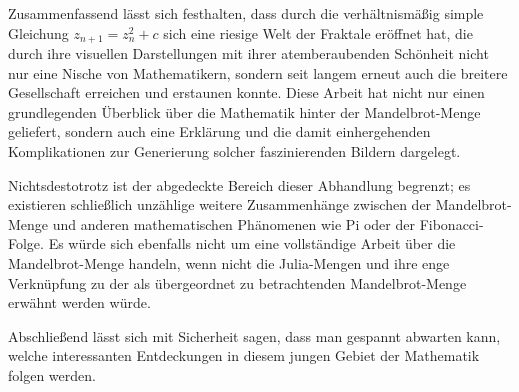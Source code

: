 
Zusammenfassend lässt sich festhalten, dass durch die verhältnismäßig simple
Gleichung $z_{n+1} = z_n^2 + c$ sich eine riesige Welt der Fraktale eröffnet
hat, die durch ihre visuellen Darstellungen mit ihrer atemberaubenden Schönheit
nicht nur eine Nische von Mathematikern, sondern seit langem erneut auch die
breitere Gesellschaft erreichen und erstaunen konnte.
Diese Arbeit hat nicht nur einen grundlegenden Überblick über die Mathematik hinter der
Mandelbrot-Menge geliefert, sondern auch eine Erklärung und die damit einhergehenden
Komplikationen zur Generierung solcher faszinierenden Bildern dargelegt.

Nichtsdestotrotz ist der abgedeckte Bereich dieser Abhandlung begrenzt; es
existieren schließlich unzählige weitere Zusammenhänge zwischen
der Mandelbrot-Menge und anderen mathematischen Phänomenen wie Pi oder der
Fibonacci-Folge.
Es würde sich ebenfalls nicht um eine vollständige Arbeit über die
Mandelbrot-Menge handeln, wenn nicht die Julia-Mengen und ihre enge Verknüpfung
zu der als übergeordnet zu betrachtenden Mandelbrot-Menge erwähnt werden würde.

Abschließend lässt sich mit Sicherheit sagen, dass man gespannt abwarten kann,
welche interessanten Entdeckungen in diesem jungen Gebiet der Mathematik folgen
werden.